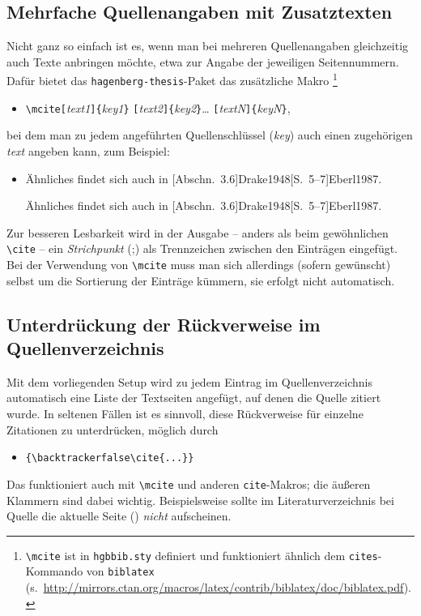 \subsection{Mehrfache Quellenangaben mit Zusatztexten}

Nicht ganz so einfach ist es, wenn man bei mehreren Quellenangaben
gleichzeitig auch Texte anbringen möchte, etwa zur Angabe der jeweiligen
Seitennummern. Dafür bietet das \texttt{hagenberg-thesis}-Paket das
zusätzliche Makro%
\footnote{\texttt{\textbackslash mcite} ist in \texttt{hgbbib.sty} definiert und
funktioniert ähnlich dem \texttt{{\bs}cites}-Kommando von \texttt{biblatex}
(s.\ \url{http://mirrors.ctan.org/macros/latex/contrib/biblatex/doc/biblatex.pdf}).}
%
\begin{itemize}
\item[]
\verb!\mcite[!\textit{text1}\verb!]{!\textit{key1}\verb!}!%
      \verb![!\textit{text2}\verb!]{!\textit{key2}\verb!}!\ldots%
			\verb![!\textit{textN}\verb!]{!\textit{keyN}\verb!}!,
\end{itemize}
%
bei dem man zu jedem angeführten Quellenschlüssel (\textit{key}) auch einen
zugehörigen \textit{text} angeben kann, zum Beispiel:
%
\begin{itemize}
    \item Ähnliches findet sich auch in
    [Abschn.~3.6]{Drake1948}[S.~5--7]{Eberl1987}.
\begin{LaTeXCode}[numbers=none]
Ähnliches findet sich auch in [Abschn.~3.6]{Drake1948}[S.~5--7]{Eberl1987}.
\end{LaTeXCode}
\end{itemize}
%
Zur besseren Lesbarkeit wird in der Ausgabe -- anders als beim gewöhnlichen
\texttt{\textbackslash cite} -- ein \emph{Strichpunkt} (;) als Trennzeichen
zwischen den Einträgen eingefügt. Bei der Verwendung von
\texttt{\textbackslash mcite} muss man sich allerdings (sofern gewünscht)
selbst um die Sortierung der Einträge kümmern, sie erfolgt nicht automatisch.


\subsection{Unterdrückung der Rückverweise im Quellenverzeichnis}

Mit dem vorliegenden Setup wird zu jedem Eintrag im Quellenverzeichnis
automatisch eine Liste der Textseiten angefügt, auf denen die Quelle zitiert
wurde. In seltenen Fällen ist es sinnvoll, diese Rückverweise für einzelne 
Zitationen zu unterdrücken, möglich durch
%
\begin{itemize}
    \item[] \verb!{\backtrackerfalse\cite{...}}!
\end{itemize}
%
Das funktioniert auch mit \verb!\mcite! und anderen \verb!cite!-Makros;
die äußeren Klammern sind dabei wichtig. Beispielsweise sollte im
Literaturverzeichnis bei Quelle {\backtrackerfalse\parencite{Bezos2023}} 
die aktuelle Seite (\the\value{page}) \emph{nicht} aufscheinen.


